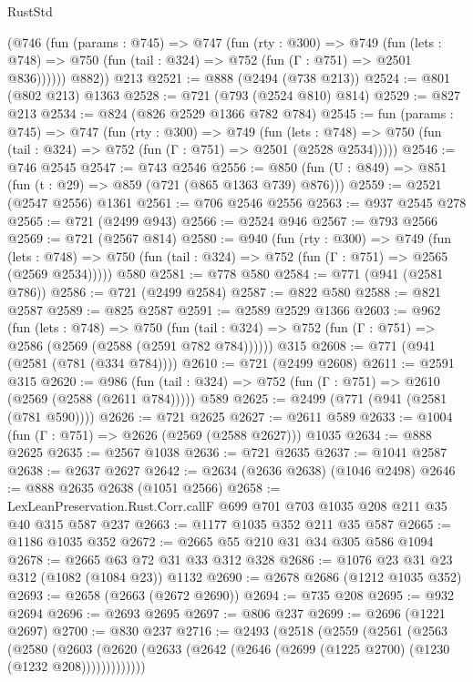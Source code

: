 \begin{lexlean}{RustStd}
\begin{coremodule}
        (@746
          (fun (params : @745) =>
          @747
            (fun (rty : @300) =>
            @749
              (fun (lets : @748) =>
              @750 (fun (tail : @324) => @752 (fun (Γ : @751) => @2501 @836))))))
        @882))
    @213
@2521 := @888 (@2494 (@738 @213))
@2524 := @801 (@802 @213) @1363
@2528 := @721 (@793 (@2524 @810) @814)
@2529 := @827 @213
@2534 := @824 (@826 @2529 @1366 @782 @784)
@2545 := fun (params : @745) =>
  @747
    (fun (rty : @300) =>
    @749
      (fun (lets : @748) =>
      @750 (fun (tail : @324) => @752 (fun (Γ : @751) => @2501 (@2528 @2534)))))
@2546 := @746 @2545
@2547 := @743 @2546
@2556 := @850 (fun (U : @849) => @851 (fun (t : @29) => @859 (@721 (@865 @1363 @739) @876)))
@2559 := @2521 (@2547 @2556) @1361
@2561 := @706 @2546 @2556
@2563 := @937 @2545 @278
@2565 := @721 (@2499 @943)
@2566 := @2524 @946
@2567 := @793 @2566
@2569 := @721 (@2567 @814)
@2580 := @940
    (fun (rty : @300) =>
    @749
      (fun (lets : @748) =>
      @750 (fun (tail : @324) => @752 (fun (Γ : @751) => @2565 (@2569 @2534)))))
    @580
@2581 := @778 @580
@2584 := @771 (@941 (@2581 @786))
@2586 := @721 (@2499 @2584)
@2587 := @822 @580
@2588 := @821 @2587
@2589 := @825 @2587
@2591 := @2589 @2529 @1366
@2603 := @962
    (fun (lets : @748) =>
    @750 (fun (tail : @324) => @752 (fun (Γ : @751) => @2586 (@2569 (@2588 (@2591 @782 @784))))))
    @315
@2608 := @771 (@941 (@2581 (@781 (@334 @784))))
@2610 := @721 (@2499 @2608)
@2611 := @2591 @315
@2620 := @986
    (fun (tail : @324) => @752 (fun (Γ : @751) => @2610 (@2569 (@2588 (@2611 @784)))))
    @589
@2625 := @2499 (@771 (@941 (@2581 (@781 @590))))
@2626 := @721 @2625
@2627 := @2611 @589
@2633 := @1004 (fun (Γ : @751) => @2626 (@2569 (@2588 @2627))) @1035
@2634 := @888 @2625
@2635 := @2567 @1038
@2636 := @721 @2635
@2637 := @1041 @2587
@2638 := @2637 @2627
@2642 := @2634 (@2636 @2638) (@1046 @2498)
@2646 := @888 @2635 @2638 (@1051 @2566)
@2658 := LexLeanPreservation.Rust.Corr.callF @699 @701 @703 @1035 @208 @211 @35 @40 @315 @587 @237
@2663 := @1177 @1035 @352 @211 @35 @587
@2665 := @1186 @1035 @352
@2672 := @2665 @55 @210 @31 @34 @305 @586 @1094
@2678 := @2665 @63 @72 @31 @33 @312 @328
@2686 := @1076 @23 @31 @23 @312 (@1082 (@1084 @23)) @1132
@2690 := @2678 @2686 (@1212 @1035 @352)
@2693 := @2658 (@2663 (@2672 @2690))
@2694 := @735 @208
@2695 := @932 @2694
@2696 := @2693 @2695
@2697 := @806 @237
@2699 := @2696 (@1221 @2697)
@2700 := @830 @237
@2716 := @2493
    (@2518
      (@2559
        (@2561
          (@2563
            (@2580
              (@2603
                (@2620 (@2633 (@2642 (@2646 (@2699 (@1225 @2700) (@1230 (@1232 @208)))))))))))))

\end{coremodule}
\end{lexlean}
